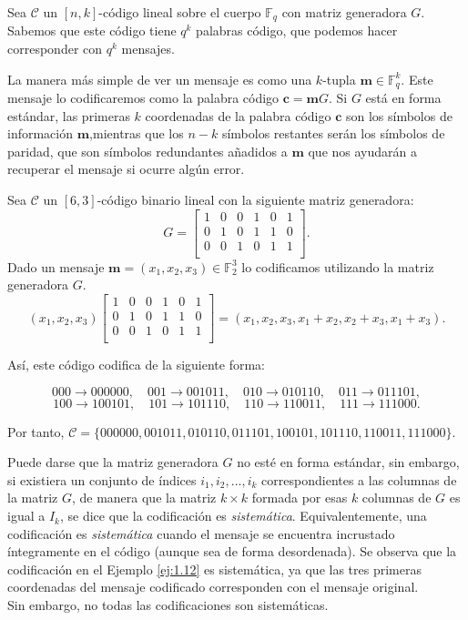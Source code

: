 Sea $\mathcal{C}$ un $[n,k]$-código lineal sobre el cuerpo $\mathds{F}_{q}$ con matriz generadora $G$. Sabemos que este código tiene $q^k$ palabras código, que podemos hacer corresponder con $q^k$ mensajes.

La manera más simple de ver un mensaje es como una $k$-tupla $\mathbf{m}\in \mathds{F}_{q}^k.$ Este mensaje lo codificaremos como la palabra código $\mathbf{c} = \mathbf{m}G$. Si $G$ está en forma estándar, las primeras $k$ coordenadas de la palabra código $\mathbf{c}$ son los símbolos de información $\mathbf{m}$,mientras que los $n-k$ símbolos restantes serán los símbolos de paridad, que son símbolos redundantes añadidos a $\textbf{m}$ que nos ayudarán a recuperar el mensaje si ocurre algún error.

\begin{ejemplo}\label{ej:1.12}

  Sea $\mathcal{C}$ un $[6,3]$-código binario lineal con la siguiente matriz generadora:
  $$ G = \left[\begin{array}{cccccc}
    1&0&0&1&0&1\\
    0&1&0&1&1&0\\
    0&0&1&0&1&1\\
    \end{array}\right].
    $$
Dado un mensaje $\mathbf{m} = (x_1,x_2,x_3) \in \mathds{F}_{2}^3$ lo codificamos utilizando la matriz generadora $G$.
$$ (x_1,x_2,x_3) \left[\begin{array}{cccccc}
  1&0&0&1&0&1\\
  0&1&0&1&1&0\\
  0&0&1&0&1&1\\
  \end{array}\right] = (x_1,x_2,x_3,x_1 + x_2,x_2 + x_3,x_1 + x_3).$$

  Así, este código codifica de la siguiente forma: 

  $$ 000 \rightarrow 000000, \quad		001 \rightarrow 001011, \quad			010 \rightarrow 010110, \quad			011 \rightarrow 011101,$$
  $$ 100 \rightarrow 100101, \quad		101 \rightarrow 101110, \quad			110 \rightarrow 110011, \quad			111 \rightarrow 111000.$$

  Por tanto, $\mathcal{C} = \{000000,001011,010110,011101,100101,101110,110011,111000\}$.
\end{ejemplo}




Puede darse que la matriz generadora $G$ no esté en forma estándar, sin embargo, si existiera un conjunto de índices $i_1,i_2,\dots,i_k$ correspondientes a las columnas de la matriz $G$, de manera que la matriz $k \times k$ formada por esas $k$ columnas de $G$ es igual a $I_k$, se dice que la codificación es \emph{sistemática}. Equivalentemente, una codificación es \emph{sistemática} cuando el mensaje se encuentra incrustado íntegramente en el código (aunque sea de forma desordenada). Se observa que la codificación en el Ejemplo \ref{ej:1.12} es sistemática, ya que las tres primeras coordenadas del mensaje codificado corresponden con el mensaje original.
\\
Sin embargo, no todas las codificaciones son sistemáticas.

